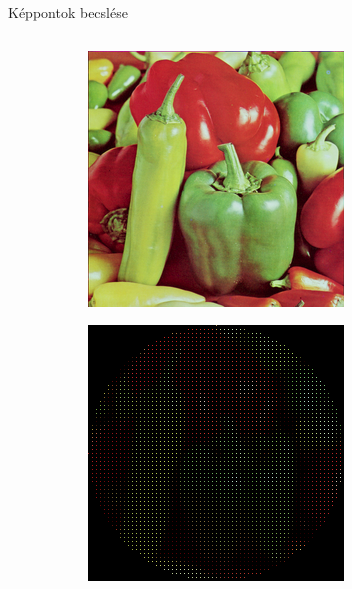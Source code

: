 \documentclass{beamer}
\begin{document}
\begin{frame}{Képpontok becslése}
\begin{columns}
    \begin{column}{0.5\textwidth}
        \begin{figure}
            \begin{subfigure}{.48\textwidth}
                \centering
            \includegraphics[width=\textwidth]{figures/pepper_color_256.png}
            \end{subfigure}
            \begin{subfigure}{.48\textwidth}
                \centering
            \includegraphics[width=\textwidth]{figures/pepper_square.png}

\end{subfigure}
\end{figure}
\end{column}
\end{columns}
\end{frame}
\end{document}
